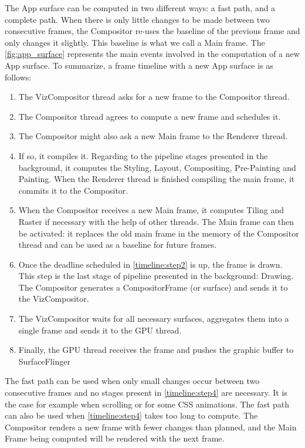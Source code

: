 \documentclass{kththesis}
\begin{document}
The App surface can be computed in two different ways: a fast path, and a complete path. When there is only little changes to be made between two consecutive frames, the Compositor re-uses the baseline of the previous frame and only changes it slightly. This baseline is what we call a Main frame.
The \autoref{fig:app_surface} represents the main events involved in the computation of a new App surface. To summarize, a frame timeline with a new App surface is as follows:
\begin{enumerate}[ref={Step}\xspace\arabic*]
    \item \label{timeline:step1} The VizCompositor thread asks for a new frame to the Compositor thread.
    \item \label{timeline:step2} The Compositor thread agrees to compute a new frame and schedules it.
    \item \label{timeline:step3}The Compositor might also ask a new Main frame to the Renderer thread.
    \item \label{timeline:step4}If so, it compiles it. Regarding to the pipeline stages presented in the background, it computes the Styling, Layout, Compositing, Pre-Painting and Painting. When the Renderer thread is finished compiling the main frame, it commits it to the Compositor.
    \item \label{timeline:step5}When the Compositor receives a new Main frame, it computes Tiling and Raster if necessary with the help of other threads. The Main frame can then be activated: it replaces the old main frame in the memory of the Compositor thread and can be used as a baseline for future frames.
    \item \label{timeline:step6} Once the deadline scheduled in \ref{timeline:step2} is up, the frame is drawn. This step is the last stage of pipeline presented in the background: Drawing. The Compositor generates a CompositorFrame (or surface) and sends it to the VizCompositor.
    \item \label{timeline:step7}The VizCompositor waits for all necessary surfaces, aggregates them into a single frame and sends it to the GPU thread.
    \item \label{timeline:step8}Finally, the GPU thread receives the frame and pushes the graphic buffer to SurfaceFlinger
\end{enumerate}

The fast path can be used when only small changes occur between two consecutive frames and no stages present in \ref{timeline:step4} are necessary. It is the case for example when scrolling or for some CSS animations. The fast path can also be used when \ref{timeline:step4} takes too long to compute. The Compositor renders a new frame with fewer changes than planned, and the Main Frame being computed will be rendered with the next frame.
\end{document}
